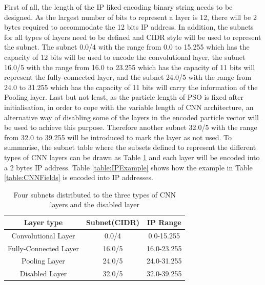 \documentclass[conference]{IEEEtran}
\begin{document}
First of all, the length of the IP liked encoding binary string needs to be designed. As the largest number of bits to represent a layer is 12, there will be 2 bytes required to accommodate the 12 bits IP address. 
In addition, the subnets for all types of layers need to be defined and CIDR style will be used to represent the subnet. The subnet 0.0/4 with the range from 0.0 to 15.255 which has the capacity of 12 bits will be used to encode the convolutional layer, the subnet 16.0/5 with the range from 16.0 to 23.255 which has the capacity of 11 bits will represent the fully-connected layer, and the subnet 24.0/5 with the range from 24.0 to 31.255 which has the capacity of 11 bits will carry the information of the Pooling layer. 
Last but not least, as the particle length of PSO is fixed after initialisation,  in order to cope with the variable length of CNN architecture, an alternative way of disabling some of the layers in the encoded particle vector will be used to achieve this purpose. Therefore another subnet 32.0/5 with the range from 32.0 to 39.255 will be introduced to mark the layer as not used. 
To summarise, the subnet table where the subsets defined to represent the different types of CNN layers can be drawn as Table \ref{table:Subnets} and each layer will be encoded into a 2 bytes IP address. Table \ref{table:IPExample} shows how the example in Table \ref{table:CNNFields} is encoded into IP addresses. 

\begin{table}[!t]
	\renewcommand{\arraystretch}{1.3}
	\caption{Four subnets distributed to the three types of CNN layers and the disabled layer}
	\label{table:Subnets}
	\centering
	\begin{tabular}{|c|c|c|}
		\hline
		Layer type & Subnet(CIDR) & IP Range\\
		\hline
		Convolutional Layer & 0.0/4 & 0.0-15.255\\
		\hline
		Fully-Connected Layer & 16.0/5 & 16.0-23.255\\
		\hline
		Pooling Layer & 24.0/5 & 24.0-31.255\\
		\hline
		Disabled Layer & 32.0/5 & 32.0-39.255\\
		\hline
	\end{tabular}
\end{table}
\end{document}
